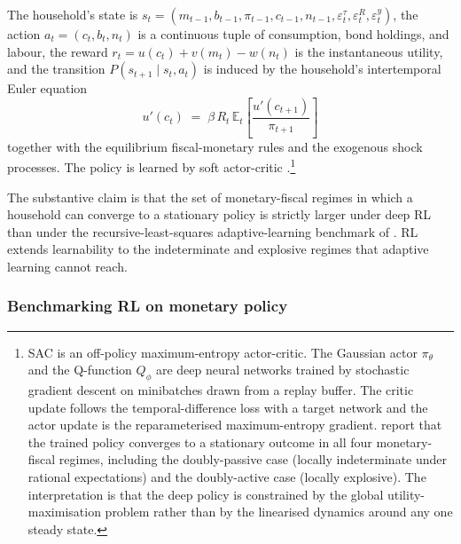 The household's state is
$s_t = (m_{t-1}, b_{t-1}, \pi_{t-1}, c_{t-1}, n_{t-1},
\varepsilon^\tau_t, \varepsilon^R_t, \varepsilon^y_t)$, the action
$a_t = (c_t, b_t, n_t)$ is a continuous tuple of consumption, bond
holdings, and labour, the reward
$r_t = u(c_t) + v(m_t) - w(n_t)$ is the instantaneous utility, and
the transition $P(s_{t+1} \mid s_t, a_t)$ is induced by the
household's intertemporal Euler equation
\begin{equation}
u'(c_t) \;=\; \beta\, R_t\, \mathbb{E}_t\!\left[\frac{u'(c_{t+1})}{\pi_{t+1}}\right]
\label{eq:macro:cjk-euler}
\end{equation}
together with the equilibrium fiscal-monetary rules and the
exogenous shock processes. The policy is learned by soft actor-critic
\citep{Haarnoja2018}.\footnote{SAC is an off-policy maximum-entropy
actor-critic. The Gaussian actor $\pi_\theta$ and the Q-function
$Q_\phi$ are deep neural networks trained by stochastic gradient
descent on minibatches drawn from a replay buffer. The critic update
follows the temporal-difference loss with a target network and the
actor update is the reparameterised maximum-entropy gradient.
\citet{Chen2021drl} report that the trained policy converges to a
stationary outcome in all four monetary-fiscal regimes, including
the doubly-passive case (locally indeterminate under rational
expectations) and the doubly-active case (locally explosive). The
interpretation is that the deep policy is constrained by the global
utility-maximisation problem rather than by the linearised dynamics
around any one steady state.}

The substantive claim is that the set of monetary-fiscal regimes in
which a household can converge to a stationary policy is strictly
larger under deep RL than under the recursive-least-squares
adaptive-learning benchmark of \citet{EvansHonkapohja2005}. RL extends
learnability to the indeterminate and explosive regimes that adaptive
learning cannot reach.

\subsubsection{Benchmarking RL on monetary policy}
\label{sec:macro:mpu}

